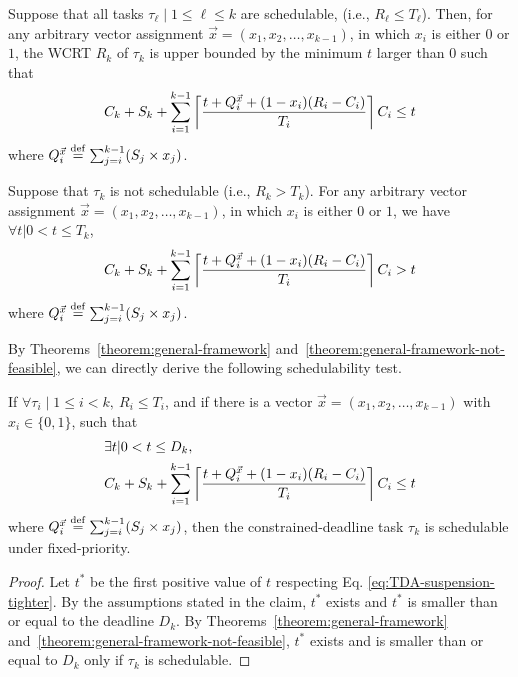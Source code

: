 \begin{theorem}
   \label{theorem:general-framework}
   Suppose that all tasks $\tau_\ell \mid 1 \leq \ell \leq k$ are schedulable, (i.e., $R_\ell \leq T_\ell$). Then, for any arbitrary vector assignment $\vec{x} = (x_1, x_2, \ldots, x_{k-1})$, in which $x_i$ is either $0$ or $1$, the WCRT $R_k$ of $\tau_k$ is upper bounded by the minimum $t$ larger than $0$ such that 
   {\small \begin{equation} \label{eq:TDA-suspension-tighter0} 
       C_k + S_k + \sum_{i=1}^{k-1}\ceiling{\frac{t+Q_i^{\vec{x}}+(1-x_i)(R_i-C_i)}{T_i}} C_i \leq t
     \end{equation}}where $Q_i^{\vec{x}} \stackrel{\mathrm{def}}{=} \sum_{j=i}^{k-1} (S_j \times x_j)$.
 \end{theorem} 
\begin{theorem}
   \label{theorem:general-framework-not-feasible}
   Suppose that $\tau_k$ is not schedulable (i.e., $R_k > T_k$). For any arbitrary vector assignment
   $\vec{x} = (x_1, x_2, \ldots, x_{k-1})$, in which $x_i$ is either
   $0$ or $1$,  we have $\forall t | 0 < t \leq T_k$,
   {\small \begin{equation*}
       C_k + S_k + \sum_{i=1}^{k-1}\left\lceil{\frac{t+Q_i^{\vec{x}}+(1-x_i)(R_i-C_i)}{T_i}}\right\rceil C_i > t
     \end{equation*}}where $Q_i^{\vec{x}} \stackrel{\mathrm{def}}{=} \sum_{j=i}^{k-1} (S_j \times x_j)$.
 \end{theorem} 
By Theorems~\ref{theorem:general-framework} and~\ref{theorem:general-framework-not-feasible}, we can directly derive the
following schedulability test.

 \begin{Corollary}
   \label{corollary:general-framework}
   If $\forall \tau_i \mid 1 \leq i < k, ~R_i \leq T_i$, and if there is a vector $\vec{x} = (x_1, x_2, \ldots,
   x_{k-1})$ with $x_i \in \{ 0, 1\}$, such that 
   {\small \begin{align} 
   \label{eq:TDA-suspension-tighter} 
       & \exists t | 0 < t \leq D_k,  \nonumber \\
       & C_k + S_k + \sum_{i=1}^{k-1}\ceiling{\frac{t+Q_i^{\vec{x}}+(1-x_i)(R_i-C_i)}{T_i}} C_i \leq t
     \end{align}}
     where $Q_i^{\vec{x}} \stackrel{\mathrm{def}}{=} \sum_{j=i}^{k-1} (S_j \times x_j)$, then the constrained-deadline task $\tau_k$ is schedulable under fixed-priority.
 \end{Corollary}
 \begin{proof}
Let $t^*$ be the first positive value of $t$ respecting Eq. \eqref{eq:TDA-suspension-tighter}. By the assumptions stated in the claim, $t^*$ exists and $t^*$ is smaller than or equal to the deadline $D_k$. By Theorems~\ref{theorem:general-framework} and~\ref{theorem:general-framework-not-feasible}, $t^*$ exists and is smaller than or equal to $D_k$ only if $\tau_k$ is schedulable.
 \end{proof}

